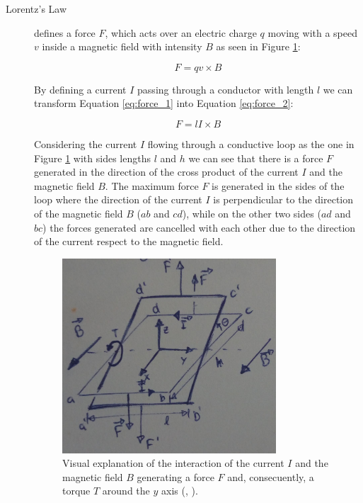 \begin{description}

\item[Lorentz's Law] defines a force $F$, which acts over an electric charge $q$ moving with a speed $v$ inside a magnetic field with intensity $B$ as seen in Figure \ref{fig:lorentz_law}:

\begin{equation}
	\label{eq:force_1}
	F = q v \times B
\end{equation}

By defining a current $I$ passing through a conductor with length $l$ we can transform Equation \ref{eq:force_1} into Equation \ref{eq:force_2}:

\begin{equation}
	\label{eq:force_2}
	F = l I \times B
\end{equation}

Considering the current $I$ flowing through a conductive loop as the one in Figure \ref{fig:lorentz_law} with sides lengths $l$ and $h$ we can see that there is a force $F$ generated in the direction of the cross product of the current $I$ and the magnetic field $B$. The maximum force $F$ is generated in the sides of the loop where the direction of the current $I$ is perpendicular to the direction of the magnetic field $B$ ($ab$ and $cd$), while on the other two sides ($ad$ and $bc$) the forces generated are cancelled with each other due to the direction of the current respect to the magnetic field.

\begin{figure}[htbp]
\centering
\includegraphics[width=8cm]{Images/lorentz_law.png} 
\caption[Lorentz's Law Diagram]{Visual explanation of the interaction of the current $I$ and the magnetic field $B$ generating a force $F$ and, consecuently, a torque $T$ around the $y$ axis (\citeauthor{sistemi_di_controllo:2007}, \citeyear{sistemi_di_controllo:2007}).}
\label{fig:lorentz_law}
\end{figure}


\end{description}
